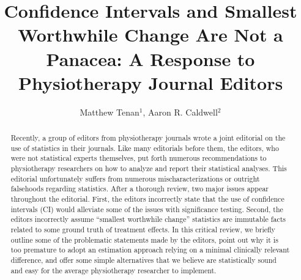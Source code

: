 \documentclass[]{cik}%
\begin{document}
\captionsetup[table]{labelformat=empty}
\captionsetup[figure]{labelformat=empty}
\raggedbottom

\title{Confidence Intervals and Smallest Worthwhile Change Are Not a
Panacea: A Response to Physiotherapy Journal Editors}

\author{
Matthew Tenan$^{1}$,
Aaron R. Caldwell$^{2}$}

\address{
}
\subject{
}


\inserttype{
{\Large }
}




\begin{abstract}
Recently, a group of editors from physiotherapy journals wrote a joint
editorial on the use of statistics in their journals. Like many
editorials before them, the editors, who were not statistical experts
themselves, put forth numerous recommendations to physiotherapy
researchers on how to analyze and report their statistical analyses.
This editorial unfortunately suffers from numerous mischaracterizations
or outright falsehoods regarding statistics. After a thorough review,
two major issues appear throughout the editorial. First, the editors
incorrectly state that the use of confidence intervals (CI) would
alleviate some of the issues with significance testing. Second, the
editors incorrectly assume ``smallest worthwhile change'' statistics are
immutable facts related to some ground truth of treatment effects. In
this critical review, we briefly outline some of the problematic
statements made by the editors, point out why it is too premature to
adopt an estimation approach relying on a minimal clinically relevant
difference, and offer some simple alternatives that we believe are
statistically sound and easy for the average physiotherapy researcher to
implement.
\end{abstract}

\providecommand{\tightlist}{%
  \setlength{\itemsep}{0pt}\setlength{\parskip}{0pt}}
\providecommand{\EndFirstPage}{%
}
\end{document}
